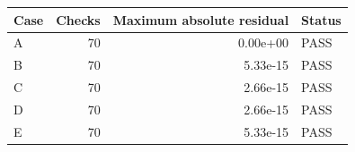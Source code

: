 \begin{tabular}{@{}lrrl@{}}
\toprule
Case & Checks & Maximum absolute residual & Status \\
\midrule
A & 70 & 0.00e+00 & PASS \\ 
B & 70 & 5.33e-15 & PASS \\ 
C & 70 & 2.66e-15 & PASS \\ 
D & 70 & 2.66e-15 & PASS \\ 
E & 70 & 5.33e-15 & PASS \\ 
\bottomrule
\end{tabular}
